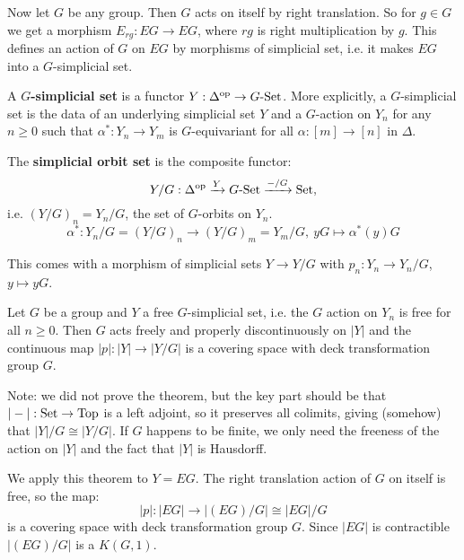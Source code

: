Now let $G$ be any group. Then $G$ acts on itself by right translation. So for $g\in G$ we get a morphism $E_{rg}:EG\to EG$, where $rg$ is right multiplication by $g$. This defines an action of $G$ on $EG$ by morphisms of simplicial set, i.e. it makes $EG$ into a $G$-simplicial set.

A \textbf{$G$-simplicial set} is a functor $Y:\Delta^{\operatorname{op}}\to G\text{-}{\mathrm{Set}}$. More explicitly, a $G$-simplicial set is the data of an underlying simplicial set $Y$ and a $G$-action on $Y_n$ for any $n\geq0$ such that $\alpha^*:Y_n\to Y_m$ is $G$-equivariant for all $\alpha:[m]\to[n]$ in $\Delta$.

The \textbf{simplicial orbit set} is the composite functor:
\[Y/G:\Delta^{\operatorname{op}}\xrightarrow{Y}G\text{-Set}\xrightarrow{-/G}{\mathrm{Set}},\]
i.e. $(Y/G)_n=Y_n/G$, the set of $G$-orbits on $Y_n$.
\[\alpha^*:Y_n/G=(Y/G)_n\to(Y/G)_m=Y_m/G,\ yG\mapsto\alpha^*(y)G\]

This comes with a morphism of simplicial sets $Y\to Y/G$ with $p_n:Y_n\to Y_n/G$, $y\mapsto yG$.

\begin{theorem}
Let $G$ be a group and $Y$ a free $G$-simplicial set, i.e. the $G$ action on $Y_n$ is free for all $n\geq0$. Then $G$ acts freely and properly discontinuously on $|Y|$ and the continuous map $|p|:|Y|\to|Y/G|$ is a covering space with deck transformation group $G$.
\end{theorem}

Note: we did not prove the theorem, but the key part should be that $|-|:{\mathrm{Set}}\to{\mathrm{Top}}$ is a left adjoint, so it preserves all colimits, giving (somehow) that $|Y|/G\cong|Y/G|$. If $G$ happens to be finite, we only need the freeness of the action on $|Y|$ and the fact that $|Y|$ is Hausdorff.

We apply this theorem to $Y=EG$. The right translation action of $G$ on itself is free, so the map:
\[|p|:|EG|\to|(EG)/G|\cong|EG|/G\]
is a covering space with deck transformation group $G$. Since $|EG|$ is contractible $|(EG)/G|$ is a $K(G,1)$.

